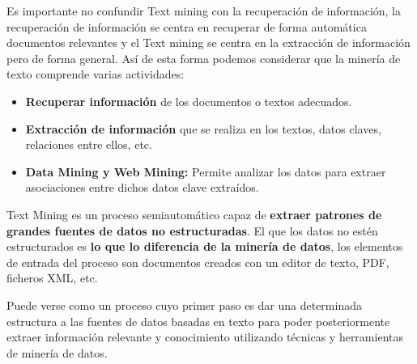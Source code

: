 \documentclass[12pt, twoside, openright]{report} %
\begin{document}
Es importante no confundir Text mining con la recuperación de información, la recuperación de información se centra en recuperar de forma automática documentos relevantes y el Text mining se centra en la extracción de información pero de forma general. Así de esta forma podemos considerar que la minería de texto comprende varias actividades:
\begin{itemize}
	\item \textbf{Recuperar información} de los documentos o textos adecuados.
	\item \textbf{Extracción de información} que se realiza en los textos, datos claves, relaciones entre ellos, etc. 
	\item \textbf{Data Mining y Web Mining:} Permite analizar los datos para extraer asociaciones entre dichos datos clave extraídos. 
\end{itemize} 
Text Mining es un proceso semiautomático capaz de \textbf{extraer patrones de grandes fuentes de datos no estructuradas}. El que los datos no estén estructurados es \textbf{lo que lo diferencia de la minería de datos}, los elementos de entrada del proceso son documentos creados con un editor de texto, PDF, ficheros XML, etc. 

Puede verse como un proceso cuyo primer paso es dar una determinada estructura a las fuentes de datos basadas en texto para poder posteriormente extraer información relevante y conocimiento utilizando técnicas y herramientas de minería de datos.
\end{document}
